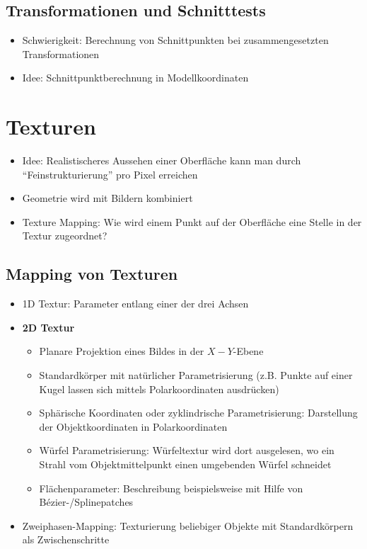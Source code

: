 \subsection{Transformationen und Schnitttests}
\begin{itemize}
	\item Schwierigkeit: Berechnung von Schnittpunkten bei zusammengesetzten Transformationen
	\item Idee: Schnittpunktberechnung in Modellkoordinaten
\end{itemize}



\section{Texturen}
\begin{itemize}
	\item Idee: Realistischeres Aussehen einer Oberfläche kann man durch "`Feinstrukturierung"' pro Pixel erreichen
	\item Geometrie wird mit Bildern kombiniert
	\item Texture Mapping: Wie wird einem Punkt auf der Oberfläche eine Stelle in der Textur zugeordnet?
\end{itemize}


\subsection{Mapping von Texturen}
\begin{itemize}
	\item 1D Textur: Parameter entlang einer der drei Achsen
	\item \textbf{2D Textur}
	\begin{itemize}
		\item Planare Projektion eines Bildes in der \(X-Y\)-Ebene
		\item Standardkörper mit natürlicher Parametrisierung (z.B. Punkte auf einer Kugel lassen sich mittels Polarkoordinaten ausdrücken)
		\item Sphärische Koordinaten oder zyklindrische Parametrisierung: Darstellung der Objektkoordinaten in Polarkoordinaten
		\item Würfel Parametrisierung: Würfeltextur wird dort ausgelesen, wo ein Strahl vom Objektmittelpunkt einen umgebenden Würfel schneidet
		\item Flächenparameter: Beschreibung beispielsweise mit Hilfe von Bézier-/Splinepatches
	\end{itemize}
	\item Zweiphasen-Mapping: Texturierung beliebiger Objekte mit Standardkörpern als Zwischenschritte
\end{itemize}

